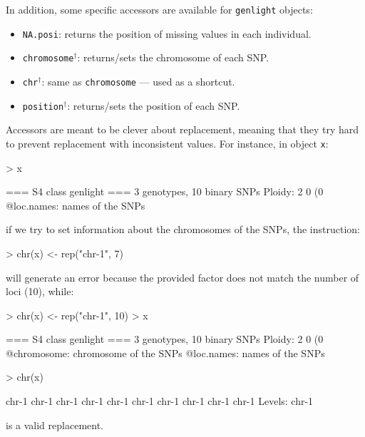 \documentclass{article}
\begin{document}
\noindent
In addition, some specific accessors are available for \texttt{genlight} objects:
\begin{itemize}
  \item \texttt{NA.posi}: returns the position of missing values in each individual.
  \item \texttt{chromosome}$^{\dagger}$: returns/sets the chromosome of each SNP.
  \item \texttt{chr}$^{\dagger}$: same as \texttt{chromosome} --- used as a shortcut.
  \item \texttt{position}$^{\dagger}$: returns/sets the position of each SNP.
\end{itemize}


Accessors are meant to be clever about replacement, meaning that they try hard to prevent
replacement with inconsistent values. For instance, in object \texttt{x}:
\begin{Schunk}
\begin{Sinput}
> x
\end{Sinput}
\begin{Soutput}
 === S4 class genlight ===
 3 genotypes,  10 binary SNPs
 Ploidy: 2
 0 (0 %) missing data
 @loc.names: names of the SNPs
\end{Soutput}
\end{Schunk}
if we try to set information about the chromosomes of the SNPs, the instruction:
\begin{Schunk}
\begin{Sinput}
> chr(x) <- rep("chr-1", 7)
\end{Sinput}
\end{Schunk}
will generate an error because the provided factor does not match the number of loci (10), while:
\begin{Schunk}
\begin{Sinput}
> chr(x) <- rep("chr-1", 10)
> x
\end{Sinput}
\begin{Soutput}
 === S4 class genlight ===
 3 genotypes,  10 binary SNPs
 Ploidy: 2
 0 (0 %) missing data
 @chromosome: chromosome of the SNPs
 @loc.names: names of the SNPs
\end{Soutput}
\begin{Sinput}
> chr(x)
\end{Sinput}
\begin{Soutput}
 [1] chr-1 chr-1 chr-1 chr-1 chr-1 chr-1 chr-1 chr-1 chr-1 chr-1
Levels: chr-1
\end{Soutput}
\end{Schunk}
is a valid replacement.
\end{document}

